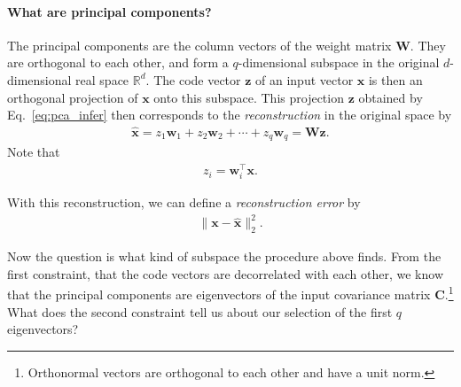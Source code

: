 \documentclass{report}
\newcommand{\vect}[1]{\mathbf{#1}}
\newcommand{\matr}[1]{\mathbf{#1}}
\newcommand{\vx}[0]{\vect{x}}
\newcommand{\vz}[0]{\vect{z}}
\newcommand{\vw}[0]{\vect{w}}
\newcommand{\mW}[0]{\matr{W}}
\newcommand{\mC}{\matr{C}}
\newcommand{\RR}[0]{\mathbb{R}}
\begin{document}
\paragraph{What are principal components?}

The principal components are the column vectors of the weight matrix $\mW$.
They are orthogonal to each other, and form a $q$-dimensional subspace in the
original $d$-dimensional real space $\RR^d$. The code vector $\vz$ of an input
vector $\vx$ is then an orthogonal projection of $\vx$ onto this subspace. This
projection $\vz$ obtained by Eq.~\eqref{eq:pca_infer} then corresponds to the
{\it reconstruction} in the original space by
\begin{align}
    \label{eq:pca_recon}
    \hat{\vx} = z_1 \vw_1 + z_2 \vw_2 + \cdots + z_q \vw_q = \mW \vz.
\end{align}
Note that
\begin{align*}
    z_i = \vw_i^\top \vx.
\end{align*}

With this reconstruction, we can define a {\it reconstruction error} by
\begin{align*}
    \| \vx - \hat{\vx} \|^2_2.
\end{align*}

Now the question is what kind of subspace the procedure above finds. From the
first constraint, that the code vectors are decorrelated with each other, we
know that the principal components are eigenvectors of the input covariance
matrix $\mC$.\footnote{
    Orthonormal vectors are orthogonal to each other and have a unit norm.
} What does the second constraint tell us about our selection of the first $q$
eigenvectors?
\end{document}
